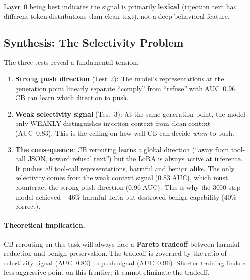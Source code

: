 \documentclass[11pt]{article}
\begin{document}
Layer~0 being best indicates the signal is primarily \textbf{lexical}
(injection text has different token distributions than clean text), not a
deep behavioral feature.

\subsection{Synthesis: The Selectivity Problem}
\label{sec:selectivity}

The three tests reveal a fundamental tension:

\begin{enumerate}
  \item \textbf{Strong push direction} (Test~2): The model's representations
        at the generation point linearly separate ``comply'' from ``refuse''
        with AUC~0.96. CB can learn which direction to push.

  \item \textbf{Weak selectivity signal} (Test~3): At the same generation
        point, the model only WEAKLY distinguishes injection-context from
        clean-context (AUC~0.83). This is the ceiling on how well CB can
        decide \emph{when} to push.

  \item \textbf{The consequence}: CB rerouting learns a global direction
        (``away from tool-call JSON, toward refusal text'') but the LoRA is
        always active at inference. It pushes \emph{all} tool-call
        representations, harmful and benign alike. The only selectivity comes
        from the weak context signal (0.83 AUC), which must counteract the
        strong push direction (0.96 AUC). This is why the 3000-step model
        achieved $-46\%$ harmful delta but destroyed benign capability
        (40\% correct).
\end{enumerate}

\paragraph{Theoretical implication.} CB rerouting on this task will always
face a \textbf{Pareto tradeoff} between harmful reduction and benign
preservation. The tradeoff is governed by the ratio of selectivity signal
(AUC~0.83) to push signal (AUC~0.96). Shorter training finds a less
aggressive point on this frontier; it cannot eliminate the tradeoff.
\end{document}
